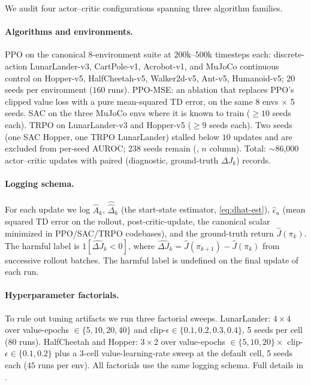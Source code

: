 \documentclass[11pt]{article}
\begin{document}
We audit four actor--critic configurations spanning three algorithm families.

\paragraph{Algorithms and environments.}
PPO \citep{schulman2017proximal} on the canonical 8-environment suite at $200$k--$500$k timesteps each: discrete-action LunarLander-v3, CartPole-v1, Acrobot-v1, and MuJoCo continuous control on Hopper-v5, HalfCheetah-v5, Walker2d-v5, Ant-v5, Humanoid-v5; 20 seeds per environment ($160$ runs). PPO-MSE: an ablation that replaces PPO's clipped value loss with a pure mean-squared TD error, on the same 8 envs $\times$ 5 seeds. SAC \citep{haarnoja2018soft} on the three MuJoCo envs where it is known to train ($\geq 10$ seeds each). TRPO \citep{schulman2015trust} on LunarLander-v3 and Hopper-v5 ($\geq 9$ seeds each). Two seeds (one SAC Hopper, one TRPO LunarLander) stalled below $10$ updates and are excluded from per-seed AUROC; 238 seeds remain (, $n$ column). Total: $\sim$86{,}000 actor--critic updates with paired (diagnostic, ground-truth $\Delta J_k$) records.

\paragraph{Logging schema.}
For each update we log $\widehat{A}_k$, $\widehat{\hat\Delta}_k$ (the start-state estimator, \cref{eq:dhat-est}), $\widehat\epsilon_u$ (mean squared TD error on the rollout, post-critic-update, the canonical scalar minimized in PPO/SAC/TRPO codebases), and the ground-truth return $\widehat J(\pi_k)$. The harmful label is $1[\widehat{\Delta J}_k < 0]$, where $\widehat{\Delta J}_k = \widehat J(\pi_{k+1}) - \widehat J(\pi_k)$ from successive rollout batches. The harmful label is undefined on the final update of each run.

\paragraph{Hyperparameter factorials.}
To rule out tuning artifacts we run three factorial sweeps. LunarLander: $4\times 4$ over value-epochs $\in \{5, 10, 20, 40\}$ and clip-$\epsilon \in \{0.1, 0.2, 0.3, 0.4\}$, 5 seeds per cell ($80$ runs). HalfCheetah and Hopper: $3\times 2$ over value-epochs $\in \{5, 10, 20\} \times$ clip-$\epsilon \in \{0.1, 0.2\}$ plus a 3-cell value-learning-rate sweep at the default cell, 5 seeds each ($45$ runs per env). All factorials use the same logging schema. Full details in .
\end{document}
